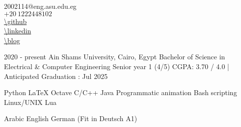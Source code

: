 \documentclass[hidelinks]{report}
\begin{document}
\noindent
\begin{minipage}{.4\textwidth}
    \vspace{-1mm}
\end{minipage}%
\hfill\hspace{.2\textwidth}
\begin{minipage}{.5\textwidth}
 \large
    2002114@eng.asu.edu.eg \\[.2\baselineskip]
    $+20 \ 1222448102$ \\[.2\baselineskip]
    \url{\github} \\[.2\baselineskip]
    \url{\linkedin} \\ %
    \url{\blog} 
\end{minipage}


\vspace{2mm}

\large 
{}

\entry
    {2020 - present} 
    {Ain Shams University, \normalfont Cairo, Egypt  }
    {Bachelor of Science in Electrical \& Computer Engineering }
    {Senior year 1 (4/5)\hspace{2mm} \textbar \hspace{2mm} CGPA: 3.70 / 4.0 | Anticipated Graduation : Jul 2025}  



\col
      {Python}          {\LaTeX}        {Octave} %
      {C/C++}           {Java}          {Programmatic animation}%
      {Bash scripting}  {Linux/UNIX}    {Lua}%

\vspace{2mm}

\col 
    {Arabic}
    {English}
    {German (Fit in Deutsch A1)}
    {} {} {} {} {} {}
\end{document}

